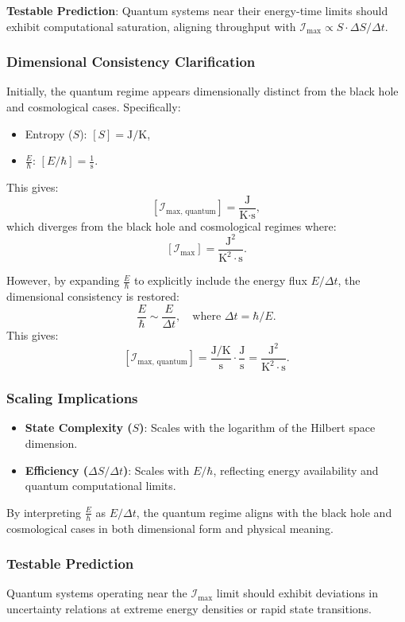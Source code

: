 \documentclass[12pt]{article}
\begin{document}
\textbf{Testable Prediction}: Quantum systems near their energy-time limits should exhibit computational saturation, aligning throughput with \( \mathcal{I}_{\text{max}} \propto S \cdot \Delta S / \Delta t \).

\subsubsection{Dimensional Consistency Clarification}
Initially, the quantum regime appears dimensionally distinct from the black hole and cosmological cases. Specifically:
\begin{itemize}
    \item Entropy (\( S \)): \( [S] = \text{J/K} \),
    \item \( \frac{E}{\hbar} \): \( [E/\hbar] = \frac{1}{\text{s}} \).
\end{itemize}

This gives:
\[
[\mathcal{I}_{\text{max, quantum}}] = \frac{\text{J}}{\text{K} \cdot \text{s}},
\]
which diverges from the black hole and cosmological regimes where:
\[
[\mathcal{I}_{\text{max}}] = \frac{\text{J}^2}{\text{K}^2 \cdot \text{s}}.
\]

However, by expanding \( \frac{E}{\hbar} \) to explicitly include the energy flux \( E / \Delta t \), the dimensional consistency is restored:
\[
\frac{E}{\hbar} \sim \frac{E}{\Delta t}, \quad \text{where } \Delta t = \hbar / E.
\]
This gives:
\[
[\mathcal{I}_{\text{max, quantum}}] = \frac{\text{J/K}}{\text{s}} \cdot \frac{\text{J}}{\text{s}} = \frac{\text{J}^2}{\text{K}^2 \cdot \text{s}}.
\]

\subsubsection{Scaling Implications}
\begin{itemize}
    \item \textbf{State Complexity (\( S \))}: Scales with the logarithm of the Hilbert space dimension.
    \item \textbf{Efficiency (\( \Delta S / \Delta t \))}: Scales with \( E / \hbar \), reflecting energy availability and quantum computational limits.
\end{itemize}

By interpreting \( \frac{E}{\hbar} \) as \( E / \Delta t \), the quantum regime aligns with the black hole and cosmological cases in both dimensional form and physical meaning.

\subsubsection{Testable Prediction}
Quantum systems operating near the \( \mathcal{I}_{\text{max}} \) limit should exhibit deviations in uncertainty relations at extreme energy densities or rapid state transitions.
\end{document}
